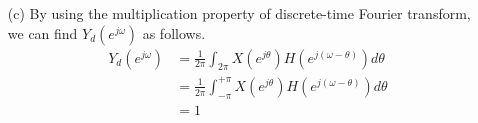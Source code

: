 \documentclass[10pt,a4paper, margin=1in]{article}
\begin{document}
\begin{enumerate}
\begin{itemize}
		\item[(c)]
			By using the multiplication property of discrete-time Fourier transform, we can find $Y_d(e^{j\omega})$ as follows.
		\begin{equation}
		\begin{split}
			Y_d(e^{j\omega}) & = \frac{1}{2\pi} \int_{2\pi} X(e^{j\theta}) H(e^{j(\omega - \theta)})d\theta\\
			& = \frac{1}{2\pi} \int_{-\pi}^{+\pi} X(e^{j\theta}) H(e^{j(\omega - \theta)})d\theta\\
			& = 1
		\end{split}
		\end{equation}
	\end{itemize}
			
  
\end{enumerate}
\end{document}
